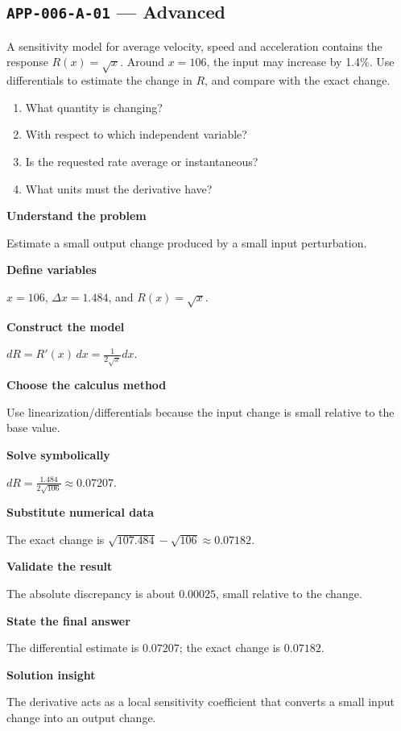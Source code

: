 \documentclass[11pt]{book}
\newcommand{\pid}[1]{\texttt{#1}}
\begin{document}
\subsection*{\pid{APP-006-A-01} — Advanced}
\begin{problembox}
A sensitivity model for average velocity, speed and acceleration contains the response $R(x)=\sqrt{x}$. Around $x=106$, the input may increase by 1.4\%. Use differentials to estimate the change in $R$, and compare with the exact change.
\end{problembox}
\begin{promptbox}\begin{enumerate}
\item What quantity is changing?
\item With respect to which independent variable?
\item Is the requested rate average or instantaneous?
\item What units must the derivative have?
\end{enumerate}\end{promptbox}
\begin{solutionbox}
\textbf{Understand the problem}\par Estimate a small output change produced by a small input perturbation.\par\medskip
\textbf{Define variables}\par $x=106$, $\Delta x=1.484$, and $R(x)=\sqrt x$.\par\medskip
\textbf{Construct the model}\par $dR=R'(x)\,dx=\frac{1}{2\sqrt{x}}dx$.\par\medskip
\textbf{Choose the calculus method}\par Use linearization/differentials because the input change is small relative to the base value.\par\medskip
\textbf{Solve symbolically}\par $dR=\frac{1.484}{2\sqrt{106}}\approx 0.07207$.\par\medskip
\textbf{Substitute numerical data}\par The exact change is $\sqrt{107.484}-\sqrt{106}\approx 0.07182$.\par\medskip
\textbf{Validate the result}\par The absolute discrepancy is about $0.00025$, small relative to the change.\par\medskip
\textbf{State the final answer}\par The differential estimate is $0.07207$; the exact change is $0.07182$.\par\medskip
\textbf{Solution insight}\par The derivative acts as a local sensitivity coefficient that converts a small input change into an output change.\par\medskip
\end{solutionbox}
\end{document}
